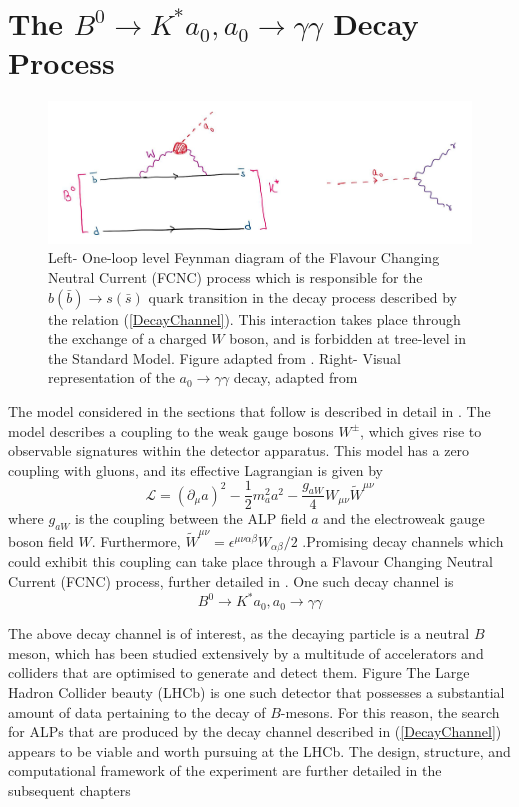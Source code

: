 \section{The $B^{0}\rightarrow K^{*}a_{0}, a_{0}\rightarrow\gamma\gamma$ Decay Process}\label{DecayProcess}
\begin{figure}[H]
    \centering
    \includegraphics[scale=0.45]{FCNCALP.jpg}
    \caption{Left- One-loop level Feynman diagram of the Flavour Changing Neutral Current (FCNC) process which is responsible for the $b(\bar{b})\rightarrow s(\bar{s})$ quark transition in the decay process described by the relation (\ref{DecayChannel}). This interaction takes place through the exchange of a charged $W$ boson, and is forbidden at tree-level in the Standard Model. Figure adapted from \cite{Izaguirre2016ANF}. Right- Visual representation of the $a_{0}\rightarrow\gamma\gamma$ decay, adapted from \cite{Michael:920}}
\end{figure}
The model considered in the sections that follow is described in detail in \cite{Izaguirre2016ANF}. The model describes a
coupling to the weak gauge bosons $W^{\pm}$, which gives rise to observable signatures within the detector apparatus. This model has a
zero coupling with gluons, and its effective Lagrangian is given by
\begin{equation}
    \mathcal{L} = (\partial_{\mu}a)^{2}-\frac{1}{2}m_{a}^{2}a^{2}-\frac{g_{aW}}{4}W_{\mu\nu}\tilde{W}^{\mu\nu}
\end{equation}
where $g_{aW}$ is the coupling between the ALP field $a$ and the electroweak gauge boson field $W$. Furthermore, $\tilde{W}^{\mu\nu} = \epsilon^{\mu\nu\alpha\beta}W_{\alpha\beta}/2$ \cite{Izaguirre2016ANF}.Promising decay channels which could exhibit this coupling can take
place through a Flavour Changing Neutral Current (FCNC) process, further detailed in \cite{Archilli:2017xmu}. One such decay channel is 
\begin{equation}\label{DecayChannel}
    B^{0}\rightarrow K^{*}a_{0}, a_{0}\rightarrow\gamma\gamma
\end{equation}

The above decay channel is of interest, as the decaying particle is a neutral $B$ meson, which has been studied extensively by a multitude of accelerators and colliders that are optimised to generate and detect
them. Figure  The Large Hadron Collider beauty (LHCb) is one such detector that possesses a substantial amount of data pertaining to the decay of $B$-mesons. For this reason, the search for ALPs that are produced by the decay channel
described in (\ref{DecayChannel}) appears to be viable and worth pursuing at the LHCb. The design, structure, and computational framework of the experiment are further detailed in the subsequent chapters




